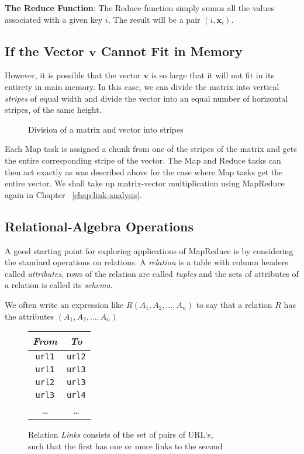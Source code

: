 \textbf{The Reduce Function}: The Reduce function simply sumus all the values associated with a given key $i$. The result will be a pair $(i, \mathbf{x}_i)$.

\subsection{If the Vector $\mathbf{v}$ Cannot Fit in Memory}\label{subsec:vector-v-cannot-fit-in-memory}

However, it is possible that the vector $\mathbf{v}$ is so large that it will not fit in its entirety in main memory. In this case, we can divide the matrix into vertical \textit{stripes} of equal width and divide the vector into an equal number of horizontal stripes, of the same height.

\begin{figure}[H]
\centering
\scalebox{0.8}{
    
}
\caption{Division of a matrix and vector into stripes}
\label{fig:matrix-vector-stripes}
\end{figure}


Each Map task is assigned a chunk from one of the stripes of the matrix and gets the entire corresponding stripe of the vector. The Map and Reduce tasks can then act exactly as was described above for the case where Map tasks get the entire vector. We shall take up matrix-vector multiplication using MapReduce again in Chapter ~\ref{chap:link-analysis}.

\subsection{Relational-Algebra Operations}\label{subsec:relational-algebra-operations}

A good starting point for exploring applications of MapReduce is by considering the standard operations on relations. A \textit{relation} is a table with column headers called \textit{attributes}, rows of the relation are called \textit{tuples} and the sets of attributes of a relation is called its \textit{schema}.

We often write an expression like $R(A_1, A_2, \dots, A_n)$ to say that a relation $R$ has the attributes $(A_1, A_2, \dots, A_n)$

\begin{figure}[H]
\centering
\begin{tabular}{|c|c|}
  \hline
  \textit{From} & \textit{To} \\
  \hline
  \texttt{url1} & \texttt{url2} \\
  \texttt{url1} & \texttt{url3} \\
  \texttt{url2} & \texttt{url3} \\
  \texttt{url3} & \texttt{url4} \\
  \dots         & \dots         \\
  \hline
\end{tabular}
\captionsetup{justification=centering}
\caption{Relation \textit{Links} consists of the set of pairs of URL`s, \\ such that the first has one or more links to the second}
\label{fig:relation-links}
\end{figure}

